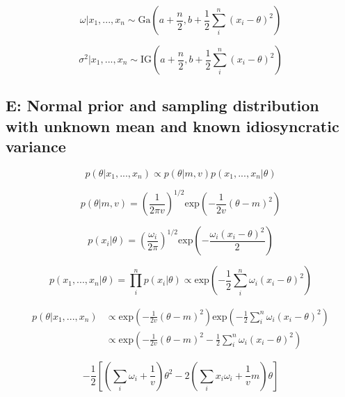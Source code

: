 \documentclass[12pt]{article}
\begin{document}
        \begin{equation}
              \omega | x_1,...,x_n \sim \text{Ga}\left (a + \frac{n}{2}, b+ \frac{1}{2}\sum_i^n(x_i - \theta)^2\right )
        \end{equation}

        \begin{equation}
              \sigma^2 | x_1,...,x_n \sim \text{IG}\left (a + \frac{n}{2}, b+ \frac{1}{2}\sum_i^n(x_i - \theta)^2\right )
        \end{equation}

    \subsection*{E: Normal prior and sampling distribution with unknown mean and known idiosyncratic variance}

        \begin{equation}
              p(\theta|x_1,..., x_n) \propto p(\theta|m,v)p(x_1,...,x_n|\theta)
        \end{equation}

        \begin{equation}
              p(\theta|m,v) = \left(\frac{1}{2 \pi v} \right )^{1/2} \text{exp}\left( - \frac{1}{2v} (\theta - m)^2\right )
        \end{equation}

        \begin{equation}
              p(x_i|\theta) = \left(\frac{\omega_i}{2 \pi} \right )^{1/2} \text{exp}\left( - \frac{\omega_i(x_i - \theta)^2}{2} \right )
        \end{equation}

        \begin{equation}
              p(x_1,...,x_n|\theta) = \prod_i^n p(x_i|\theta) \propto \text{exp}\left( - \frac{1}{2} \sum_i^n\omega_i(x_i - \theta)^2 \right )
        \end{equation}

        \begin{align}
            p(\theta|x_1,...,x_n) &\propto \text{exp}\left( - \frac{1}{2v} (\theta - m)^2\right) \text{exp}\left( - \frac{1}{2} \sum_i^n\omega_i(x_i - \theta)^2\right)\\
            &\propto \text{exp}\left(-\frac{1}{2v}(\theta - m)^2 - \frac{1}{2} \sum_i^n\omega_i(x_i - \theta)^2\right)
        \end{align}

        \begin{equation}
            -\frac{1}{2} \left[ \left(\sum_i \omega_i + \frac{1}{v} \right) \theta^2 - 2 \left ( \sum_i x_i \omega_i + \frac{1}{v}m\right) \theta\right]
        \end{equation}
\end{document}
